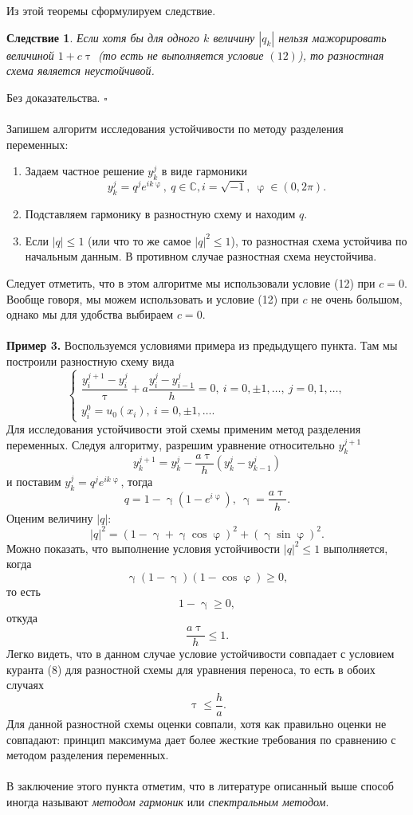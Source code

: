 \documentclass[a4paper, 12pt]{report}
\numberwithin{equation}{section}
\newenvironment{Proof} %
{\par\noindent{$\blacklozenge$}} %
{\hfill$\scriptstyle\square$}
\newcommand{\Cm}{\mathbb{C}}
\renewcommand{\leq}{\leqslant}
\renewcommand{\geq}{\geqslant}
\renewcommand{\gamma}{\upgamma}
\renewcommand{\varphi}{\upvarphi}
\renewcommand{\tau}{\uptau}
\newtheorem*{cor}{Следствие}
\begin{document}
 Из этой теоремы сформулируем следствие.
 \begin{cor}
	 	Если хотя бы для одного $k$ величину $|q_k|$ нельзя мажорировать величиной $1+c\tau$ (то есть не выполняется условие $(12)$), то разностная схема является неустойчивой. 
 \end{cor}
 \begin{Proof}
	 	Без доказательства.
 \end{Proof}\\\\
 Запишем алгоритм исследования устойчивости по методу разделения переменных:
 \begin{enumerate}
	 	\item Задаем частное решение $y_k^j$ в виде гармоники $$y_k^j = q^j e^{ik\varphi },\ q \in \Cm, i = \sqrt{-1},\ \varphi\in (0,2\pi).$$
	 	\item Подставляем гармонику в разностную схему и находим $q$.
	 	\item Если $|q|\leq 1$ (или что то же самое $|q| ^2 \leq 1$), то разностная схема устойчива по начальным данным. В противном случае разностная схема неустойчива. 
 \end{enumerate}
 Следует отметить, что в этом алгоритме мы использовали условие (12) при $c=0$. Вообще говоря, мы можем использовать и условие (12) при $c$ не очень большом, однако мы для удобства выбираем $c=0$.
 \\\\
 \textbf{Пример 3.} Воспользуемся условиями примера из предыдущего пункта. Там мы построили разностную схему вида
 $$\begin{cases}
	 	\dfrac{y_i^{j+1}-y_i^j}{\tau} + a \dfrac{y_i^j - y_{i-1}^j}{h} = 0,\ i =0,\pm1,\ldots,\ j = 0,1,\ldots,\\
	 	y_i^0 = u_0(x_i),\ i =0,\pm1,\ldots.
 \end{cases}$$
 Для исследования устойчивости этой схемы применим метод разделения переменных. Следуя алгоритму, разрешим уравнение относительно $y_k^{j+1}$
 $$y_k^{j+1} = y_k^j - \dfrac {a\tau}h (y_k^j - y_{k-1}^j)$$
 и поставим $y_k^j = q^j e^{ik \varphi}$, тогда 
 $$q = 1 - \gamma(1 - e^{i\varphi}), \ \gamma = \dfrac {a\tau}h.$$
 Оценим величину $|q|$:
 $$|q|^2 = (1-\gamma + \gamma \cos \varphi)^2 + (\gamma \sin \varphi)^2.$$
 Можно показать, что выполнение условия устойчивости $|q|^2\leq 1$ выполняется, когда
 $$\gamma(1-\gamma)(1-\cos \varphi)\geq 0,$$
 то есть $$1 - \gamma \geq 0,$$
 откуда
 $$\dfrac {a\tau}h \leq 1.$$
 Легко видеть, что в данном случае условие устойчивости совпадает с условием куранта (8) для разностной схемы для уравнения переноса, то есть
 в обоих случаях
 $$\tau \leq \dfrac h a.$$
 Для данной разностной схемы оценки совпали, хотя как правильно оценки не совпадают: принцип максимума дает более жесткие требования по сравнению с методом разделения переменных.\\\\
 В заключение этого пункта отметим, что в литературе описанный выше способ иногда называют \textit{методом гармоник} или \textit{спектральным методом}.
\end{document}
